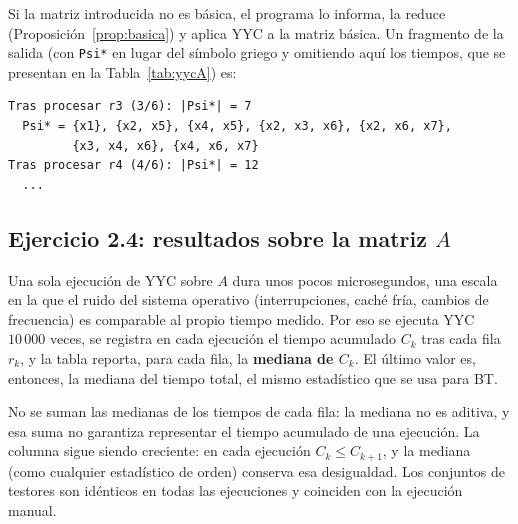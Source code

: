 \documentclass[11pt, a4paper]{article}
\theoremstyle{definition}
\theoremstyle{plain}
\begin{document}
Si la matriz introducida no es básica, el programa lo informa, la reduce
(Proposición~\ref{prop:basica}) y aplica YYC a la matriz básica. Un fragmento de
la salida (con \texttt{Psi*} en lugar del símbolo griego y omitiendo aquí los
tiempos, que se presentan en la Tabla~\ref{tab:yycA}) es:

\begin{Verbatim}[fontsize=\small, frame=single]
Tras procesar r3 (3/6): |Psi*| = 7
  Psi* = {x1}, {x2, x5}, {x4, x5}, {x2, x3, x6}, {x2, x6, x7},
         {x3, x4, x6}, {x4, x6, x7}
Tras procesar r4 (4/6): |Psi*| = 12
  ...
\end{Verbatim}

\subsection{Ejercicio 2.4: resultados sobre la matriz $A$}\label{sec:yyc-res}

Una sola ejecución de YYC sobre $A$ dura unos pocos microsegundos, una escala
en la que el ruido del sistema operativo (interrupciones, caché fría, cambios de
frecuencia) es comparable al propio tiempo medido. Por eso se ejecuta YYC $10\,000$ veces, se registra en cada ejecución
el tiempo acumulado $C_k$ tras cada fila $r_k$, y la tabla reporta, para cada
fila, la \textbf{mediana de $C_k$}. El último valor es, entonces, la mediana del
tiempo total, el mismo estadístico que se usa para BT.

No se suman las medianas de los tiempos de cada fila: la mediana no es aditiva,
y esa suma no garantiza representar el tiempo acumulado de una ejecución. La columna sigue
siendo creciente: en cada ejecución $C_k\le C_{k+1}$, y la mediana (como
cualquier estadístico de orden) conserva esa desigualdad. Los conjuntos de
testores son idénticos en todas las ejecuciones y coinciden con la ejecución
manual.

\begin{table}[h]
\centering
\small

\caption{YYC sobre la matriz $A$: testores típicos de las filas procesadas y tiempo
de ejecución acumulado después de cada fila (mediana de 10\,000 ejecuciones).}
\label{tab:yycA}
\end{table}
\end{document}
